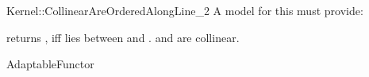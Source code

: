 \begin{ccRefFunctionObjectConcept}{Kernel::CollinearAreOrderedAlongLine_2}
A model for this must provide:


         {returns , iff  lies between  
          and . \ccPrecond {} and  are 
          collinear.}

\ccRefines
AdaptableFunctor

\ccSeeAlso

 \\


\end{ccRefFunctionObjectConcept}
